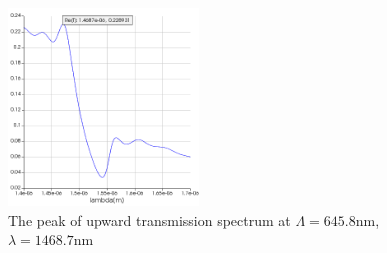 \documentclass[fontsize=11pt]{scrartcl}
\begin{document}
\begin{figure}[H]
    \centering
     \includegraphics[width=0.45\textwidth]{img/fig3.5.png}
     \caption{The peak of upward transmission spectrum at $\Lambda=645.8\mathrm{nm}$,
     $\lambda=1468.7\mathrm{nm}$}
     \label{fig3.5}
\end{figure}
\end{document}
